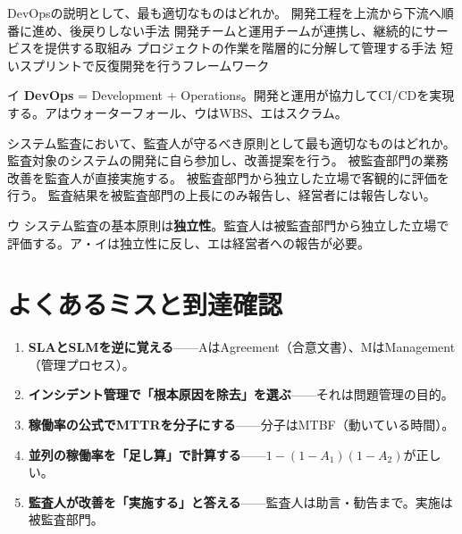\begin{itpmon}{%
DevOpsの説明として、最も適切なものはどれか。}
\sentakushi
  {開発工程を上流から下流へ順番に進め、後戻りしない手法}
  {開発チームと運用チームが連携し、継続的にサービスを提供する取組み}
  {プロジェクトの作業を階層的に分解して管理する手法}
  {短いスプリントで反復開発を行うフレームワーク}
\end{itpmon}
\begin{kaisetsu}{イ}
\textbf{DevOps} = Development + Operations。開発と運用が協力してCI/CDを実現する。アはウォーターフォール、ウはWBS、エはスクラム。
\end{kaisetsu}

\begin{itpmon}{%
システム監査において、監査人が守るべき原則として最も適切なものはどれか。}
\sentakushi
  {監査対象のシステムの開発に自ら参加し、改善提案を行う。}
  {被監査部門の業務改善を監査人が直接実施する。}
  {被監査部門から独立した立場で客観的に評価を行う。}
  {監査結果を被監査部門の上長にのみ報告し、経営者には報告しない。}
\end{itpmon}
\begin{kaisetsu}{ウ}
システム監査の基本原則は\textbf{独立性}。監査人は被監査部門から独立した立場で評価する。ア・イは独立性に反し、エは経営者への報告が必要。
\end{kaisetsu}

\section{よくあるミスと到達確認}

\begin{yokumiss}[この章でよくあるミス]
\begin{enumerate}[leftmargin=1.6em, itemsep=5pt]
  \item \textbf{SLAとSLMを逆に覚える}——AはAgreement（合意文書）、MはManagement（管理プロセス）。
  \item \textbf{インシデント管理で「根本原因を除去」を選ぶ}——それは問題管理の目的。
  \item \textbf{稼働率の公式でMTTRを分子にする}——分子はMTBF（動いている時間）。
  \item \textbf{並列の稼働率を「足し算」で計算する}——$1-(1-A_1)(1-A_2)$が正しい。
  \item \textbf{監査人が改善を「実施する」と答える}——監査人は助言・勧告まで。実施は被監査部門。
\end{enumerate}
\end{yokumiss}

